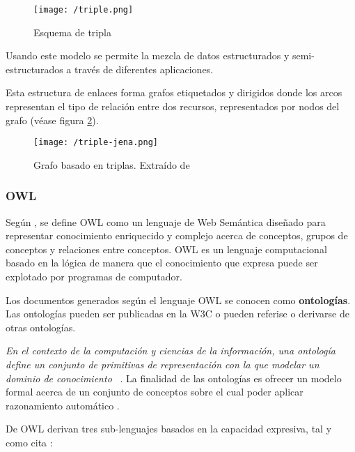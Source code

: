\begin{figure}[!h]
  \begin{center}
    \texttt{[image: /triple.png]} 
    \caption{Esquema de tripla}
    \label{fig:triple}
  \end{center}
\end{figure}

Usando este modelo se permite la mezcla de datos estructurados y
semi-estructurados a través de diferentes aplicaciones. 

Esta estructura de enlaces forma grafos etiquetados y dirigidos donde los
arcos representan el tipo de relación entre dos recursos, representados por
nodos del grafo (véase figura \ref{fig:triplejena}). 

\begin{figure}[!h]
  \begin{center}
    \texttt{[image: /triple-jena.png]} 
    \caption{Grafo basado en triplas. Extraído de \cite{JENA}}
    \label{fig:triplejena}
  \end{center}
\end{figure}


\subsubsection{\acf{OWL}}

Según \cite{OWL}, se define \acs{OWL} como un lenguaje de Web Semántica
  diseñado para representar conocimiento enriquecido y complejo acerca de
  conceptos, grupos de conceptos y relaciones entre conceptos. \acs{OWL} es un
  lenguaje computacional basado en la lógica de manera que el conocimiento que
  expresa puede ser explotado por programas de computador.

Los documentos generados según el lenguaje \acs{OWL} se conocen como
\textbf{ontologías}. Las ontologías pueden ser publicadas en la \acs{W3C} o
pueden referise o derivarse de otras ontologías. 

\textit{En el contexto de la computación y ciencias de la información, una
  ontología define un conjunto de primitivas de representación con la que
  modelar un dominio de conocimiento} ~\cite{GRUBER}. La finalidad de las
ontologías es ofrecer un modelo formal acerca de un conjunto de conceptos sobre
el cual poder aplicar razonamiento automático . 

De \acs{OWL} derivan tres sub-lenguajes basados en la capacidad expresiva, tal y como cita \cite{OWL}: 

